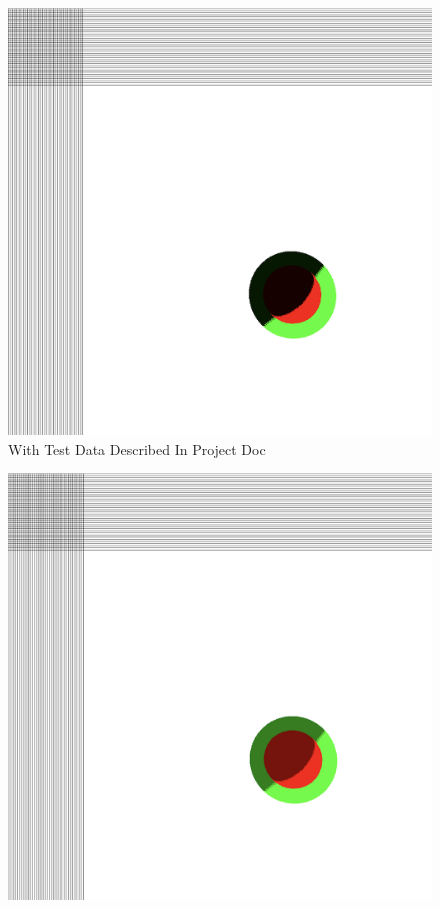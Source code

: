 \documentclass{article}
\begin{document}
\begin{centering}
\begin{figure}[H]
\includegraphics[width=1\textwidth]{./images/TestData.png}
\caption{With Test Data Described In Project Doc}
\label{fig:figure2}
\end{figure}
\begin{figure}[H]
\includegraphics[width=1\textwidth]{./images/Ambient05.png}

\end{figure}
\end{centering}
\end{document}
